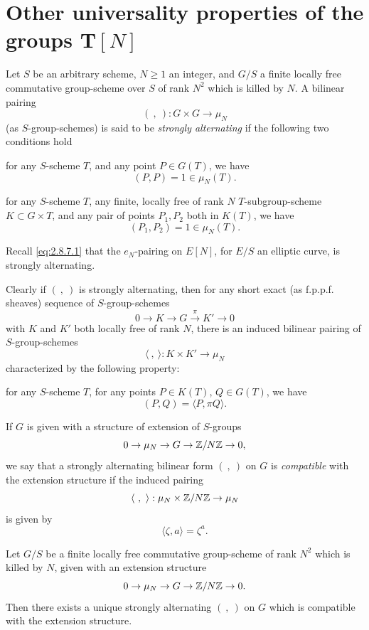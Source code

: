 \section{Other universality properties of the groups $\mathbf{T}[N]$}
\label{sec:8.10}

\kmitem\label{item:8.10.1}
Let $S$ be an arbitrary scheme, $N \ge 1$ an integer, and $G/S$ a finite locally free commutative group-scheme over $S$ of rank $N^2$ which is killed by $N$. A bilinear pairing
\[
(\ ,\ ) : G \times G \to \mu_N
\]
(as $S$-group-schemes) is said to be \emph{strongly alternating} if the following two conditions hold

for any $S$-scheme $T$, and any point $P \in G(T)$, we have
\[
(P,P) = 1 \in \mu_N(T) .
\]

for any $S$-scheme $T$, any finite, locally free of rank $N$ $T$-subgroup-scheme $K \subset G \times T$, and any pair of points $P_1, P_2$ both in $K(T)$, we have
\[
(P_1,P_2) = 1 \in \mu_N(T) .
\]

Recall \eqref{eq:2.8.7.1} that the $e_N$-pairing on $E[N]$, for $E/S$ an elliptic curve, is strongly alternating.

\kmitem\label{item:8.10.2}
Clearly if $(\ ,\ )$ is strongly alternating, then for any short exact (as f.p.p.f. sheaves) sequence of $S$-group-schemes
\[
0 \to K \to G \xrightarrow{\ \pi\ } K' \to 0
\]
with $K$ and $K'$ both locally free of rank $N$, there is an induced bilinear pairing of $S$-group-schemes
\[
\langle\ ,\ \rangle : K \times K' \to \mu_N
\]
characterized by the following property:

for any $S$-scheme $T$, for any points $P \in K(T)$, $Q \in G(T)$, we have
\[
(P,Q) = \langle P, \pi Q \rangle .
\]

\kmitem\label{item:8.10.3}
If $G$ is given with a structure of extension of $S$-groups
\[
0 \to \mu_N \to G \to \mathbb{Z}/N\mathbb{Z} \to 0 ,
\]
we say that a strongly alternating bilinear form $(\ ,\ )$ on $G$ is \emph{compatible} with the extension structure if the induced pairing
\[
\langle\ ,\ \rangle : \mu_N \times \mathbb{Z}/N\mathbb{Z} \to \mu_N
\]
is given by
\[
\langle \zeta, a \rangle = \zeta^a .
\]

\begin{klem}\label{lem:8.10.4}
Let $G/S$ be a finite locally free commutative group-scheme of rank $N^2$ which is killed by $N$, given with an extension structure
\[
0 \to \mu_N \to G \to \mathbb{Z}/N\mathbb{Z} \to 0 .
\]
Then there exists a unique strongly alternating $(\ ,\ )$ on $G$ which is compatible with the extension structure.
\end{klem}

